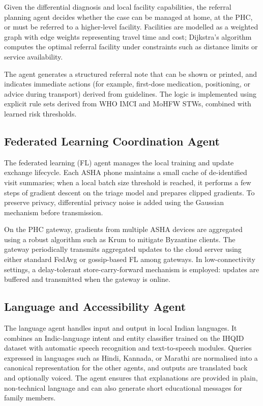 \documentclass[conference]{IEEEtran}
\begin{document}
Given the differential diagnosis and local facility capabilities, the referral planning agent decides whether the case can be managed at home, at the PHC, or must be referred to a higher-level facility. Facilities are modelled as a weighted graph with edge weights representing travel time and cost; Dijkstra's algorithm computes the optimal referral facility under constraints such as distance limits or service availability.

The agent generates a structured referral note that can be shown or printed, and indicates immediate actions (for example, first-dose medication, positioning, or advice during transport) derived from guidelines. The logic is implemented using explicit rule sets derived from WHO IMCI and MoHFW STWs, combined with learned risk thresholds.

\subsection{Federated Learning Coordination Agent}

The federated learning (FL) agent manages the local training and update exchange lifecycle. Each ASHA phone maintains a small cache of de-identified visit summaries; when a local batch size threshold is reached, it performs a few steps of gradient descent on the triage model and prepares clipped gradients. To preserve privacy, differential privacy noise is added using the Gaussian mechanism before transmission.

On the PHC gateway, gradients from multiple ASHA devices are aggregated using a robust algorithm such as Krum to mitigate Byzantine clients. The gateway periodically transmits aggregated updates to the cloud server using either standard FedAvg or gossip-based FL among gateways. In low-connectivity settings, a delay-tolerant store-carry-forward mechanism is employed: updates are buffered and transmitted when the gateway is online.

\subsection{Language and Accessibility Agent}

The language agent handles input and output in local Indian languages. It combines an Indic-language intent and entity classifier trained on the IHQID dataset with automatic speech recognition and text-to-speech modules. Queries expressed in languages such as Hindi, Kannada, or Marathi are normalised into a canonical representation for the other agents, and outputs are translated back and optionally voiced. The agent ensures that explanations are provided in plain, non-technical language and can also generate short educational messages for family members.
\end{document}
